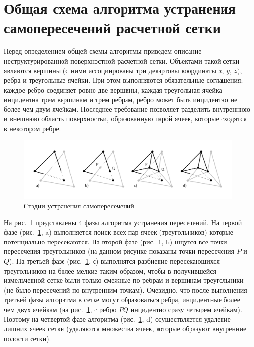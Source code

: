 \documentclass[
11pt,%
tightenlines,%
twoside,%
onecolumn,%
nofloats,%
nobibnotes,%
nofootinbib,%
superscriptaddress,%
noshowpacs,%
centertags]%
{revtex4}
\begin{document}
\section{Общая схема алгоритма устранения самопересечений расчетной сетки}

Перед определением общей схемы алгоритмы приведем описание неструктурированной поверхностной расчетной сетки.
Объектами такой сетки являются вершины (с ними ассоциированы три декартовы координаты $x$, $y$, $z$), ребра и треугольные ячейки.
При этом выполняются обязательные соглашения: каждое ребро соединяет ровно две вершины, каждая треугольная ячейка инцидентна трем вершинам и трем ребрам, ребро может быть инцидентно не более чем двум ячейкам.
Последнее требование позволяет разделить внутреннюю и внешнюю область поверхностьи, образованную парой ячеек, которые сходятся в некотором ребре.

\begin{figure}[h]
\includegraphics[width=1.0\textwidth]{pics/pic_algorithm_phases_s.pdf}
\caption{Стадии устранения самопересечений.}\label{fig:pic_algorithm_phases_s}
\end{figure}

На рис.~\ref{fig:pic_algorithm_phases_s} представлены 4 фазы алгоритма устранения пересечений.
На первой фазе (рис.~\ref{fig:pic_algorithm_phases_s}, a) выполняется поиск всех пар ячеек (треугольников) которые потенциально пересекаются.
На второй фазе (рис.~\ref{fig:pic_algorithm_phases_s}, b) ищутся все точки пересечения треугольников (на данном рисунке показаны точки пересечения $P$ и $Q$).
На третьей фазе (рис.~\ref{fig:pic_algorithm_phases_s}, с) выполнятся разбиение пересекающихся треугольников на более мелкие таким образом, чтобы в получившейся измельченной сетке были только смежные по ребрам и вершинам треугольники (не было пересечений по внутренним точкам).
Очевидно, что после выполнения третьей фазы алгоритма в сетке могут образоваться ребра, инцидентные более чем двух ячейкам (на рис.~\ref{fig:pic_algorithm_phases_s}, с ребро $PQ$ инцидентно сразу четырем ячейкам).
Поэтому на четвертой фазе алгоритма (рис.~\ref{fig:pic_algorithm_phases_s}, d) осуществляется удаление лишних ячеек сетки (удаляются множества ячеек, которые образуют внутренние полости сетки).
\end{document}
